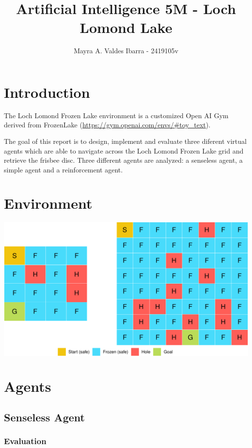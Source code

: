 \documentclass[11pt,]{article}
\title{Artificial Intelligence 5M - Loch Lomond Lake}
\author{Mayra A. Valdes Ibarra - 2419105v}
\date{}
\begin{document}
\maketitle

\section{Introduction}\label{introduction}

The Loch Lomond Frozen Lake environment is a customized Open AI Gym
derived from FrozenLake (\url{https://gym.openai.com/envs/\#toy_text}).

The goal of this report is to design, implement and evaluate three
diferent virtual agents which are able to navigate across the Loch
Lomond Frozen Lake grid and retrieve the frisbee disc. Three different
agents are analyzed: a senseless agent, a simple agent and a
reinforcement agent.

\section{Environment}\label{environment}

\begin{center}\includegraphics[width=0.7\linewidth]{project_files/figure-latex/environments-1} \end{center}

\section{Agents}\label{agents}

\subsection{Senseless Agent}\label{senseless-agent}

\subsubsection{Evaluation}\label{evaluation}
\end{document}
